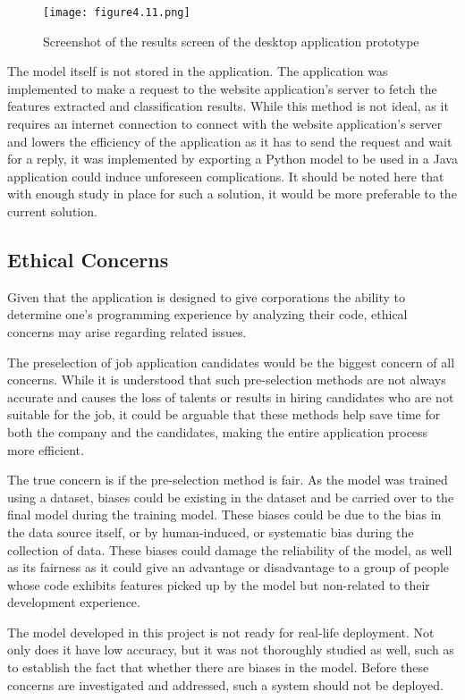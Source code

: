 \documentclass{report}
\begin{document}
\begin{figure}[h!]
\centering
\texttt{[image: figure4.11.png]}
\caption{Screenshot of the results screen of the desktop application prototype}
\end{figure}

The model itself is not stored in the application. The application was implemented to make a request to the website application’s server to fetch the features extracted and classification results. While this method is not ideal, as it requires an internet connection to connect with the website application’s server and lowers the efficiency of the application as it has to send the request and wait for a reply, it was implemented by exporting a Python model to be used in a Java application could induce unforeseen complications. It should be noted here that with enough study in place for such a solution, it would be more preferable to the current solution.

\subsection{Ethical Concerns}

Given that the application is designed to give corporations the ability to determine one’s programming experience by analyzing their code, ethical concerns may arise regarding related issues.

The preselection of job application candidates would be the biggest concern of all concerns. While it is understood that such pre-selection methods are not always accurate and causes the loss of talents or results in hiring candidates who are not suitable for the job, it could be arguable that these methods help save time for both the company and the candidates, making the entire application process more efficient.

The true concern is if the pre-selection method is fair. As the model was trained using a dataset, biases could be existing in the dataset and be carried over to the final model during the training model. These biases could be due to the bias in the data source itself, or by human-induced, or systematic bias during the collection of data. These biases could damage the reliability of the model, as well as its fairness as it could give an advantage or disadvantage to a group of people whose code exhibits features picked up by the model but non-related to their development experience.

The model developed in this project is not ready for real-life deployment. Not only does it have low accuracy, but it was not thoroughly studied as well, such as to establish the fact that whether there are biases in the model. Before these concerns are investigated and addressed, such a system should not be deployed.
\end{document}
